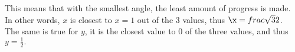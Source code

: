 \documentclass[preview]{standalone}
\begin{document}
\begin{center}
This means that with the smallest angle, the least amount of progress is made. \\ In other words, $x$ is closest to $x=1$ out of the 3 values, thus $ \x=frac{\sqrt{3}}{2} $. \\ The same is true for $y$, it is the closest value to 0 of the three values, and thus $y=\frac{1}{2}.$
\end{center}
\end{document}
